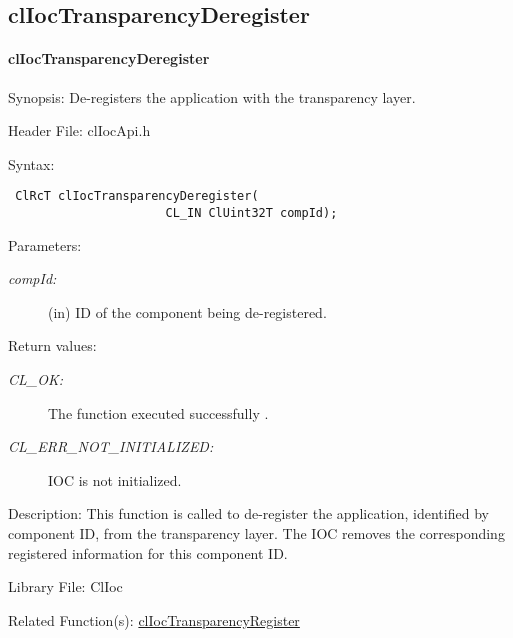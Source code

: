 \begin{flushleft}
\subsection{clIocTransparencyDeregister}
\hypertarget{pageioc119}{}\paragraph{cl\-Ioc\-Transparency\-Deregister}\label{pageioc119}
\begin{Desc}
\item[Synopsis:]De-registers the application with the transparency layer.\end{Desc}
\begin{Desc}
\item[Header File:]clIocApi.h\end{Desc}
\begin{Desc}
\item[Syntax:]

\footnotesize\begin{verbatim} ClRcT clIocTransparencyDeregister(
                      CL_IN ClUint32T compId);
\end{verbatim}
\normalsize
\end{Desc}
\begin{Desc}
\item[Parameters:]
\begin{description}
\item[{\em comp\-Id:}](in) ID of the component being de-registered.\end{description}
\end{Desc}
\begin{Desc}
\item[Return values:]
\begin{description}
\item[{\em CL\_\-OK:}]The function executed successfully . \item[{\em CL\_\-ERR\_\-NOT\_\-INITIALIZED:}]IOC is not initialized.\end{description}
\end{Desc}
\begin{Desc}
\item[Description:]This function is called to de-register the application, identified by component ID, from the transparency layer. The IOC removes 
the corresponding registered information for this component ID.\end{Desc}
\begin{Desc}
\item[Library File:]Cl\-Ioc\end{Desc}
\begin{Desc}
\item[Related Function(s):]\hyperlink{pageioc118}{cl\-Ioc\-Transparency\-Register} \end{Desc}
\newpage



\end{flushleft}
